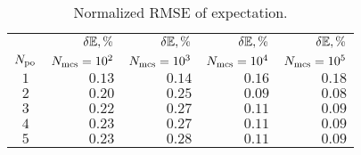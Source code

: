 \begin{table}
  \centering
  \caption{Normalized RMSE of expectation.}
  \vspace{-10pt}
  \begin{tabular}{crrrr}
    \toprule
    {} & $\delta\mathbb{E}, \%$ & $\delta\mathbb{E}, \%$ & $\delta\mathbb{E}, \%$ & $\delta\mathbb{E}, \%$ \\
    ${N_\text{po}}$ & $N_\text{mcs} = 10^2$ & $N_\text{mcs} = 10^3$ & $N_\text{mcs} = 10^4$ & $N_\text{mcs} = 10^5$ \\
    \midrule
    $1$ & $0.13$ & $0.14$ & $0.16$ & $0.18$ \\
    $2$ & $0.20$ & $0.25$ & $0.09$ & $0.08$ \\
    $3$ & $0.22$ & $0.27$ & $0.11$ & $0.09$ \\
    $4$ & $0.23$ & $0.27$ & $0.11$ & $0.09$ \\
    $5$ & $0.23$ & $0.28$ & $0.11$ & $0.09$ \\
    \bottomrule
  \end{tabular}
  \vspace{-10pt}
\end{table}
